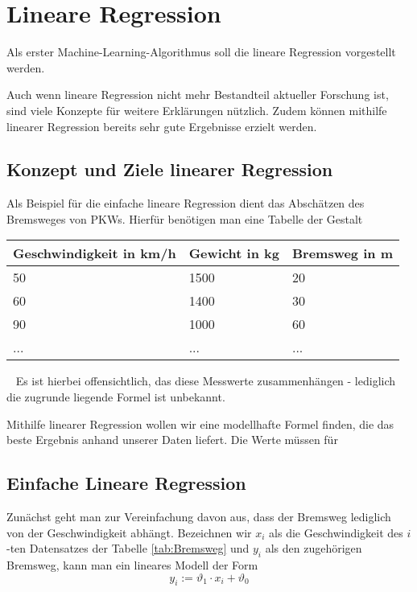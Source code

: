 \section{Lineare Regression}
\label{sec:LineareRegression}
Als erster Machine-Learning-Algorithmus soll die lineare Regression vorgestellt werden. 

Auch wenn lineare Regression nicht mehr Bestandteil aktueller Forschung ist, sind viele Konzepte für weitere Erklärungen nützlich. Zudem können mithilfe linearer Regression bereits sehr gute Ergebnisse erzielt werden.
\subsection{Konzept und Ziele linearer Regression}
Als Beispiel für die einfache lineare Regression dient das Abschätzen des Bremsweges von PKWs. Hierfür benötigen man eine Tabelle der Gestalt

\begin{center}
	\label{tab:Bremsweg}
	\begin{tabular}{|p{}|p{}|p{}|}
		\hline
		Geschwindigkeit in km/h & Gewicht in kg & Bremsweg in m  \\ \hline
		50& 1500 & 20 \\ \hline
		60& 1400 & 30 \\ \hline
		90& 1000 & 60 \\ \hline
		...& ... & ... \\ \hline
	\end{tabular}
\end{center}
~\newline
Es ist hierbei offensichtlich, das diese Messwerte zusammenhängen - lediglich die zugrunde liegende Formel ist unbekannt. 

Mithilfe linearer Regression wollen wir eine modellhafte Formel finden, die das beste Ergebnis anhand unserer Daten liefert. Die Werte müssen für 
\subsection{Einfache Lineare Regression}
Zunächst geht man zur Vereinfachung davon aus, dass der Bremsweg lediglich von der Geschwindigkeit abhängt. Bezeichnen wir $x_i$ als die Geschwindigkeit des $i$-ten Datensatzes der Tabelle \ref{tab:Bremsweg} und $y_i$ als den zugehörigen Bremsweg, kann man ein lineares Modell der Form 
\begin{equation}
	y_i := \vartheta_1 \cdot x_i + \vartheta_0 
\end{equation}


